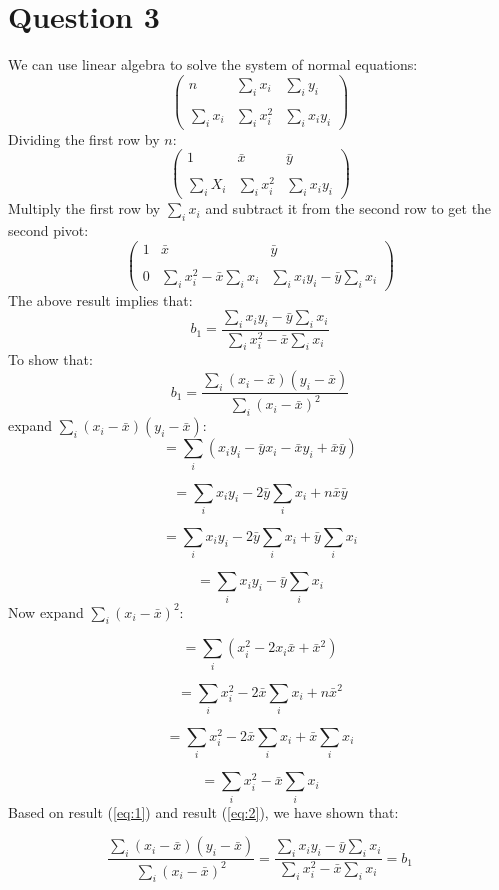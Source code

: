 \documentclass[12pt,a4paper]{report}
\begin{document}
\section*{Question 3}
We can use linear algebra to solve the system of normal equations:
\[
\begin{pmatrix}
n & \sum_i x_i & \sum_i y_i\\
\\
\sum_i x_i & \sum_i x_i^2 & \sum_i x_i y_i
\end{pmatrix}
\]
Dividing the first row by $n$:
\[
\begin{pmatrix}
1 & \bar{x} & \bar{y}\\
\\
\sum_i X_i & \sum_i x_i^2 & \sum_i x_i y_i
\end{pmatrix}
\]
Multiply the first row by $\sum_i x_i$ and subtract it from the second row to get the second pivot:
\[
\begin{pmatrix}
1 & \bar{x} & \bar{y}\\
\\
0 & \sum_i x_i^2 - \bar{x}\sum_i x_i & \sum_i x_i y_i
 - \bar{y}\sum_i x_i
 \end{pmatrix}
\]
The above result implies that:
\[
b_1 = \dfrac{\sum_i x_i y_i
 - \bar{y}\sum_i x_i}{\sum_i x_i^2 - \bar{x}\sum_i x_i}
\]
To show that:
\[
b_1 = \dfrac{\sum_i\left(x_i-\bar{x}\right)\left(y_i - \bar{x}\right)}{\sum_i\left(x_i-\bar{x}\right)^2}
\]
expand $\sum_i\left(x_i-\bar{x}\right)\left(y_i - \bar{x}\right)$:
\[
= \sum_i\left(x_iy_i-\bar{y}x_i-\bar{x}y_i+\bar{x}\bar{y}\right)
\]

\[
= \sum_i x_i y_i-2\bar{y}\sum_i x_i+n\bar{x}\bar{y}
\]

\[
= \sum_i x_i y_i-2\bar{y}\sum_i x_i+\bar{y}\sum_i x_i
\]

\begin{equation} \label{eq:1}
= \sum_i x_i y_i-\bar{y}\sum_i x_i
\end{equation}
Now expand $\sum_i\left(x_i-\bar{x}\right)^2$:

\[
=\sum_i \left(x_i^2-2x_i\bar{x}+\bar{x}^2\right)
\]

\[
=\sum_i x_i^2-2\bar{x} \sum_i x_i+n \bar{x}^2
\]

\[
=\sum_i x_i^2-2\bar{x} \sum_i x_i+\bar{x}\sum_i x_i
\]

\begin{equation} \label{eq:2}
=\sum_i x_i^2-\bar{x} \sum_i x_i
\end{equation}
Based on result (\ref{eq:1}) and result (\ref{eq:2}), we have shown that:

\[
\dfrac{\sum_i\left(x_i-\bar{x}\right)\left(y_i - \bar{x}\right)}{\sum_i\left(x_i-\bar{x}\right)^2} = \dfrac{\sum_i x_i y_i
 - \bar{y}\sum_i x_i}{\sum_i x_i^2 - \bar{x}\sum_i x_i} = b_1
\]
\end{document}
